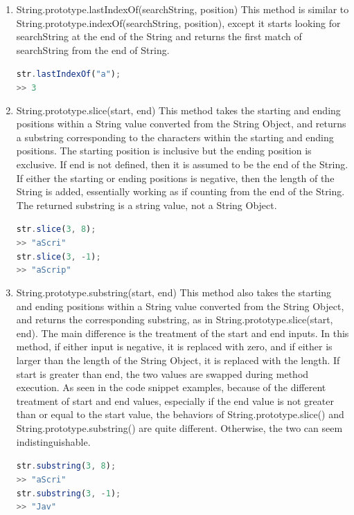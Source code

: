 \documentclass[a4paper,11pt,twoside]{report}
\def\jsinline{\lstinline[language=JavaScript, basicstyle=\small]}%\end{lstlisting}
\begin{document}
\begin{enumerate}
\item String.prototype.lastIndexOf(searchString, position) \newline
This method is similar to String.prototype.indexOf(searchString, position), except it starts looking for searchString at the end of the String and returns the first match of searchString from the end of String.

\jsinline|str.lastIndexOf("a");| \\
\jsinline|>> 3|

\item String.prototype.slice(start, end) \newline
This method takes the starting and ending positions within a String value converted from the String Object, and returns a substring corresponding to the characters within the starting and ending positions. The starting position is inclusive but the ending position is exclusive. If end is not defined, then it is assumed to be the end of the String. If either the starting or ending positions is negative, then the length of the String is added, essentially working as if counting from the end of the String. The returned substring is a string value, not a String Object.

\jsinline|str.slice(3, 8);| \\
\jsinline|>> "aScri"| \\
\jsinline|str.slice(3, -1);| \\
\jsinline|>> "aScrip"|

\item String.prototype.substring(start, end) \newline
This method also takes the starting and ending positions within a String value converted from the String Object, and returns the corresponding substring, as in String.prototype.slice(start, end). The main difference is the treatment of the start and end inputs. In this method, if either input is negative, it is replaced with zero, and if either is larger than the length of the String Object, it is replaced with the length. If start is greater than end, the two values are swapped during method execution. As seen in the code snippet examples, because of the different treatment of start and end values, especially if the end value is not greater than or equal to the start value, the behaviors of String.prototype.slice() and String.prototype.substring() are quite different. Otherwise, the two can seem indistinguishable.

\jsinline|str.substring(3, 8);| \\
\jsinline|>> "aScri"| \\
\jsinline|str.substring(3, -1);| \\
\jsinline|>> "Jav"|

\end{enumerate}
\end{document}
